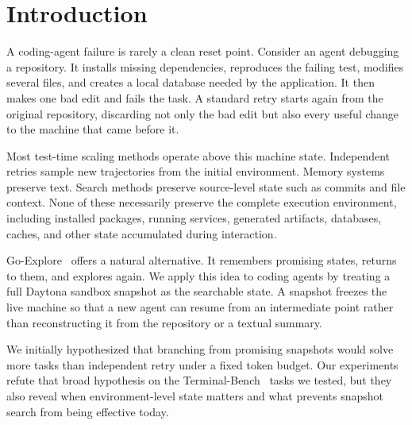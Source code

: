 \documentclass{article}
\begin{document}
\section{Introduction}
\label{sec:intro}

A coding-agent failure is rarely a clean reset point. Consider an agent debugging a repository. It installs missing dependencies, reproduces the failing test, modifies several files, and creates a local database needed by the application. It then makes one bad edit and fails the task. A standard retry starts again from the original repository, discarding not only the bad edit but also every useful change to the machine that came before it.

Most test-time scaling methods operate above this machine state. Independent retries sample new trajectories from the initial environment. Memory systems preserve text. Search methods preserve source-level state such as commits and file context. None of these necessarily preserve the complete execution environment, including installed packages, running services, generated artifacts, databases, caches, and other state accumulated during interaction.

Go-Explore~\citep{ecoffet2021goexplore} offers a natural alternative. It remembers promising states, returns to them, and explores again. We apply this idea to coding agents by treating a full Daytona sandbox snapshot as the searchable state. A snapshot freezes the live machine so that a new agent can resume from an intermediate point rather than reconstructing it from the repository or a textual summary.

We initially hypothesized that branching from promising snapshots would solve more tasks than independent retry under a fixed token budget. Our experiments refute that broad hypothesis on the Terminal-Bench~\citep{merrill2026terminalbench} tasks we tested, but they also reveal when environment-level state matters and what prevents snapshot search from being effective today.
\end{document}
